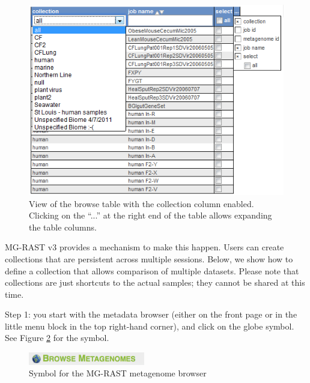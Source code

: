 \documentclass[12pt,fullpage]{report}
\begin{document}
\begin{figure}[ht]
\begin{center}
\includegraphics[width=6in]{Images/collections-total-list1.png}
\end{center}
\caption{
View of the browse table with the collection column enabled. Clicking on the ``...'' at the right end of the table allows expanding the table columns.
}
\label{fig:collections-total-list1}
\end{figure}

MG-RAST v3 provides a mechanism to make this happen. Users can create collections that are persistent across multiple sessions.
Below, we show how to define a collection that allows comparison of multiple datasets. Please note that collections are just shortcuts to the actual samples; they cannot be shared at this time.

Step 1: you start with the metadata browser (either on the front page or in the little menu block in the top right-hand corner), and click on the globe symbol. See Figure \ref{fig:browse-for-metagenomes} for the symbol.

\begin{figure}[ht]
\begin{center}
\includegraphics[width=2in]{Images/browse-for-metagenomes.png}
\end{center}
\caption{
Symbol for the MG-RAST metagenome browser}
\label{fig:browse-for-metagenomes}
\end{figure}
\end{document}
